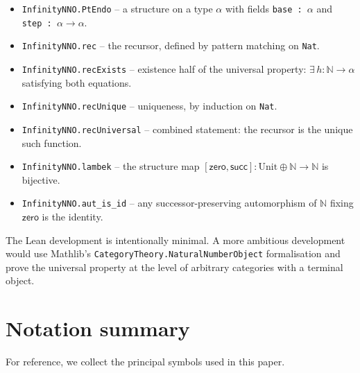 \documentclass[12pt]{article}
\theoremstyle{definition}
\theoremstyle{remark}
\newcommand{\N}{\mathbb{N}}
\newcommand{\zero}{\mathsf{zero}}
\newcommand{\suc}{\mathsf{succ}}
\begin{document}
\begin{itemize}
  \item \texttt{InfinityNNO.PtEndo} -- a structure on a type $\alpha$ with fields \texttt{base : $\alpha$} and \texttt{step : $\alpha\to\alpha$}.
  \item \texttt{InfinityNNO.rec} -- the recursor, defined by pattern matching on \texttt{Nat}.
  \item \texttt{InfinityNNO.recExists} -- existence half of the universal property: $\exists\,h\colon\N\to\alpha$ satisfying both equations.
  \item \texttt{InfinityNNO.recUnique} -- uniqueness, by induction on \texttt{Nat}.
  \item \texttt{InfinityNNO.recUniversal} -- combined statement: the recursor is the unique such function.
  \item \texttt{InfinityNNO.lambek} -- the structure map $[\zero,\suc]\colon\mathrm{Unit}\oplus\N\to\N$ is bijective.
  \item \texttt{InfinityNNO.aut\_is\_id} -- any successor-preserving automorphism of $\N$ fixing $\zero$ is the identity.
\end{itemize}

The Lean development is intentionally minimal. A more ambitious development would use Mathlib's \texttt{CategoryTheory.NaturalNumberObject} formalisation and prove the universal property at the level of arbitrary categories with a terminal object.

\section{Notation summary}\label{app:notation}

For reference, we collect the principal symbols used in this paper.
\end{document}
